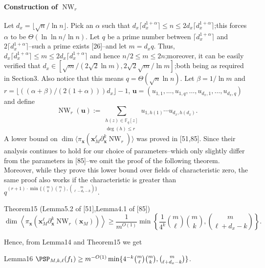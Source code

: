 \paragraph{Construction of $\operatorname{NW}_r$}
Let $d_x=\lfloor\sqrt n/\ln n\rfloor$. Pick an $\alpha$ such that $d_x\lceil d_x^{1+\alpha}\rceil\le n\le2d_x\lceil d_x^{1+\alpha}\rceil$;this forces $\alpha$ to be $\Theta(\ln\ln n/\ln n)$. Let $q$ be a prime number between $\lceil d_x^{1+\alpha}\rceil$ and $2\lceil d_x^{1+\alpha}\rceil$--such a prime exists [26]--and let $m=d_xq$. Thus, $d_x\lceil d_x^{1+\alpha}\rceil\le m\le2d_x\lceil d_x^{1+\alpha}\rceil$ and hence $n/2\le m\le2n$;moreover, it can be easily verified that $d_x\in[\sqrt m/(2\sqrt2\ln m),2\sqrt2\sqrt m/\ln m]$;both being as required in Section3. Also notice that this means $q=\Theta(\sqrt n\ln n)$. Let $\beta=1/\ln m$ and $r=\lfloor((\alpha+\beta)/(2(1+\alpha)))d_x\rfloor-1$, $\mathbf u=(u_{1,1},\ldots,u_{1,q},\ldots,u_{d_x,1},\ldots,u_{d_x,q})$ and define
\[
\operatorname{NW}_r(\mathbf u):=\sum_{\substack{h(z)\in\mathbb F_q[z]\\\deg(h)\le r}}u_{1,h(1)}\cdots u_{d_x,h(d_x)}.
\]
A lower bound on $\dim\langle\pi_{\mathbf x}(\mathbf x_M^\ell\partial_{\mathbf x}^k\operatorname{NW}_r)\rangle$ was proved in [51,85]. Since their analysis continues to hold for our choice of parameters--which only slightly differ from the parameters in [85]--we omit the proof of the following theorem. Moreover, while they prove this lower bound over fields of characteristic zero, the same proof also works if the characteristic is greater than
$q^{(r+1)\cdot\min\{\binom mk\binom m\ell,\binom m{\ell-d_x-k}\}}$.
\begin{authorclaim}{Theorem15 (Lemma5.2 of [51],Lemma4.1 of [85])}
\[
\dim\left\langle\pi_{\mathbf x}(\mathbf x_M^\ell\partial_{\mathbf x}^k\operatorname{NW}_r(\mathbf x_M))\right\rangle
\ge\frac1{m^{O(1)}}\min\left\{\frac1{4^k}\binom m\ell\binom mk,\binom m{\ell+d_x-k}\right\}.
\]
\end{authorclaim}
Hence, from Lemma14 and Theorem15 we get
\begin{authorclaim}{Lemma16}
$\PSP_{M,k,\ell}(f_1)\ge m^{-O(1)}\min\{4^{-k}\binom m\ell\binom mk,\binom m{\ell+d_x-k}\}$.
\end{authorclaim}
